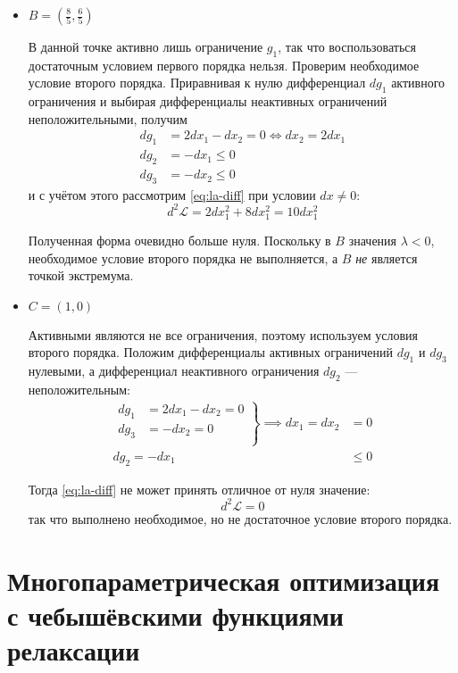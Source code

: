 \documentclass{article}
\renewcommand{\leq}{\leqslant}
\providecommand{\La}{\mathcal{L}}
\theoremstyle{remark}
\theoremstyle{definition}
\numberwithin{equation}{section}
\begin{document}
\begin{itemize}
\item $B = (\frac{8}{5}, \frac{6}{5})$

  В данной точке активно лишь ограничение $g_1$, так что
  воспользоваться достаточным условием первого порядка нельзя.
  Проверим необходимое условие второго порядка. Приравнивая к нулю
  дифференциал $dg_1$ активного ограничения и выбирая дифференциалы
  неактивных ограничений неположительными, получим
  \begin{align*}
    dg_1 &= 2dx_1-dx_2 = 0 \iff dx_2 = 2dx_1 \\
    dg_2 &= -dx_1 \leq 0 \\
    dg_3 &= -dx_2 \leq 0
  \end{align*}
  и с учётом этого рассмотрим \eqref{eq:la-diff} при условии $dx≠0$:
  \begin{equation*}
    d^2\La = 2dx_1^2 + 8dx_1^2 = 10dx_1^2
  \end{equation*}
  
  Полученная форма очевидно больше нуля. Поскольку в $B$ значения
  $\lambda < 0$, необходимое условие второго порядка не выполняется, а
  $B$ \emph{не} является точкой экстремума.

\item $C = (1, 0)$

  Активными являются не все ограничения, поэтому используем условия
  второго порядка. Положим дифференциалы активных ограничений $dg_1$ и
  $dg_3$ нулевыми, а дифференциал неактивного ограничения $dg_2$ —
  неположительным:
  \begin{align*}
    \left.
      \begin{aligned}
        dg_1 &= 2dx_1-dx_2 = 0 \\
        dg_3 &= - dx_2 = 0 \\
      \end{aligned}
    \right \} \implies dx_1 = dx_2 &= 0 \\
    dg_2 = - dx_1 &\leq 0
  \end{align*}
  
  Тогда \eqref{eq:la-diff} не может принять отличное от нуля значение:
  \begin{equation}
    d^2\La = 0
  \end{equation}
  так что выполнено необходимое, но не достаточное условие второго
  порядка.
\end{itemize}
  
\clearpage
\section{Многопараметрическая оптимизация\\
  с чебышёвскими функциями релаксации}
\label{sec:relch}
\end{document}
